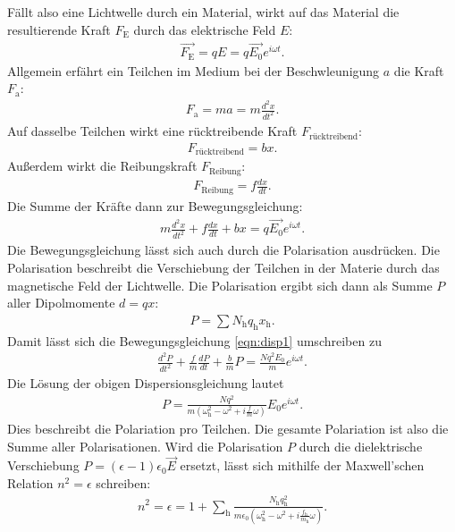 Fällt also eine Lichtwelle durch ein Material, wirkt auf das Material die resultierende Kraft $F_{\text{E}}$ durch das elektrische Feld $E$:
\begin{align*}
  \vec{F_{\text{E}}}= q E = q \vec{E_{\text{0}}} e^{i \omega t}.
\end{align*}
Allgemein erfährt ein Teilchen im Medium bei der Beschwleunigung $a$ die Kraft $F_{\text{a}}$:
\begin{align*}
  F_{\text{a}}= m a = m \frac{d^2 x}{d t^2}.
\end{align*}
Auf dasselbe Teilchen wirkt eine rücktreibende Kraft $F_{\text{rücktreibend}}$:
\begin{align*}
  F_{\text{rücktreibend}}= b x.
\end{align*}
Außerdem wirkt die Reibungskraft $F_{\text{Reibung}}$:
\begin{align*}
  F_{\text{Reibung}}= f \frac{d x}{d t}.
\end{align*}
Die Summe der Kräfte dann zur Bewegungsgleichung:
\begin{align}
  m \frac{d^2 x}{d t^2} + f \frac{d x}{d t} + b x = q \vec{E_{\text{0}}} e^{i \omega t}.
  \label{eqn:disp1}
\end{align}
Die Bewegungsgleichung lässt sich auch durch die Polarisation ausdrücken.
Die Polarisation beschreibt die Verschiebung der Teilchen in der Materie durch das magnetische Feld der Lichtwelle.
Die Polarisation ergibt sich dann als Summe $P$ aller Dipolmomente $d=q x$:
\begin{align*}
  P= \sum N_{\text{h}} q_{\text{h}} x_{\text{h}}.
\end{align*}
Damit lässt sich die Bewegungsgleichung \eqref{eqn:disp1} umschreiben zu
\begin{align*}
  \frac{d^2 P}{d t^2}+\frac{f}{m} \frac{d P}{d t}+ \frac{b}{m}P = \frac{N q^2 E_{\text{0}}}{m} e^{i \omega t}.
\end{align*}
Die Lösung der obigen Dispersionsgleichung lautet
\begin{align*}
  P= \frac{N q^2}{m\left(\omega^2_{\text{h}}-\omega^2+i\frac{f}{m}\omega \right)} E_{\text{0}} e^{i \omega t}.
\end{align*}
Dies beschreibt die Polariation pro Teilchen.
Die gesamte Polariation ist also die Summe aller Polarisationen.
Wird die Polarisation $P$ durch die dielektrische Verschiebung $P=(\epsilon -1)\epsilon_{\text{0}}\vec{E}$ ersetzt, lässt sich mithilfe der Maxwell'schen Relation $n^2=\epsilon$ schreiben:
\begin{align*}
  n^2 = \epsilon = 1+\sum_{\text{h}} \frac{N_{\text{h}} q_{\text{h}}^2}{m \epsilon_{\text{0}}\left(\omega^2_{\text{h}}-\omega^2+i\frac{f_{\text{h}}}{m_{\text{h}}}\omega \right)}.
\end{align*}
